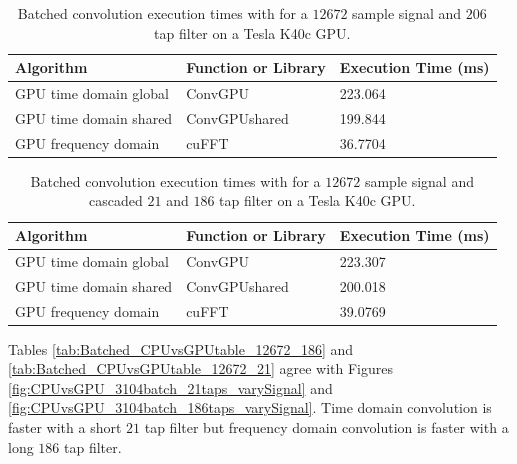 \begin{table}
\caption{Batched convolution execution times with for a $12672$ sample signal and $206$ tap filter on a Tesla K40c GPU.}
\begin{center}
\begin{tabular}{lll}
	\toprule
	Algorithm 				& Function or Library		& Execution Time (ms) \\ \midrule
	GPU time domain global 	& ConvGPU 					& 223.064		\\
	GPU time domain shared 	& ConvGPUshared 			& 199.844		\\
	GPU frequency domain 	& cuFFT						& 36.7704		\\ 
	\bottomrule
\end{tabular}
\end{center}
\label{tab:Batched_CPUvsGPUtable_12672_206}
\end{table}
\begin{table}
\caption{Batched convolution execution times with for a $12672$ sample signal and cascaded $21$ and $186$ tap filter on a Tesla K40c GPU.}
\begin{center}
\begin{tabular}{lll}
	\toprule
	Algorithm 				& Function or Library		& Execution Time (ms) \\ \midrule
	GPU time domain global 	& ConvGPU 					& 223.307		\\
	GPU time domain shared 	& ConvGPUshared 			& 200.018		\\
	GPU frequency domain 	& cuFFT						& 39.0769		\\ 
	\bottomrule
\end{tabular}
\end{center}
\label{tab:Batched_CPUvsGPUtable_12672_21_186}
\end{table}

Tables \ref{tab:Batched_CPUvsGPUtable_12672_186} and \ref{tab:Batched_CPUvsGPUtable_12672_21} agree with Figures \ref{fig:CPUvsGPU_3104batch_21taps_varySignal} and \ref{fig:CPUvsGPU_3104batch_186taps_varySignal}.
Time domain convolution is faster with a short $21$ tap filter but frequency domain convolution is faster with a long $186$ tap filter.

